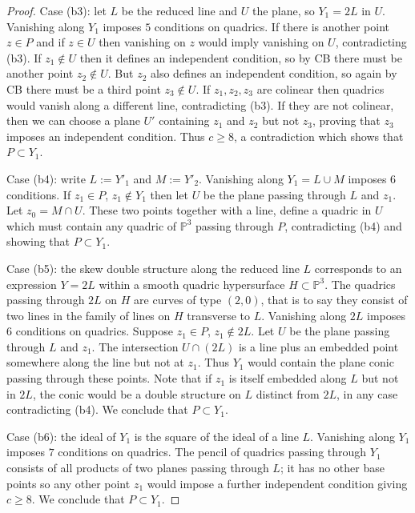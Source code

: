\documentclass{amsart}
\theoremstyle{plain}
\numberwithin{equation}{section}
\begin{document}
\begin{proof}
Case (b3): let $L$ be the reduced line and $U$ the plane, so $Y_1=2L$ in $U$.
Vanishing along $Y_1$ imposes $5$ conditions on quadrics. If there is another point 
$z\in P$ and if $z\in U$ then vanishing on $z$ would imply vanishing on $U$,
contradicting (b3). If $z_1\not \in U$ then it defines an independent condition,
so by CB there must be another point $z_2\not \in U$. But $z_2$ also defines an
independent condition, so again by CB there must be a third point $z_3\not \in U$.
If $z_1,z_2,z_3$ are colinear then quadrics would vanish along a different line,
contradicting (b3). If they are not colinear, then we can choose
a plane $U'$ containing $z_1$ and $z_2$ but not $z_3$, proving that $z_3$ imposes
an independent condition. Thus $c\geq 8$, a contradiction which shows that $P\subset Y_1$.

Case (b4): write $L:= Y'_1$ and $M:= Y'_2$. Vanishing along $Y_1=L\cup M$ imposes 
$6$ conditions. If $z_1\in P$, $z_1\not \in Y_1$ then let $U$ be the plane passing through
$L$ and $z_1$. Let $z_0=M\cap U$. These two points together with a line, define a quadric
in $U$ which must contain any quadric of ${{\mathbb P}} ^3$ passing through $P$, contradicting
(b4) and showing that $P\subset Y_1$. 

Case (b5): the skew double structure along the reduced line $L$ corresponds to
an expression $Y=2L$ within a smooth quadric hypersurface $H\subset {{\mathbb P}} ^3$. The quadrics
passing through $2L$ on $H$ are curves of type $(2,0)$, that is to say they consist
of two lines in the family of lines on $H$ transverse to $L$. Vanishing along $2L$ imposes
$6$ conditions on quadrics. Suppose $z_1\in P$, $z_1\not \in 2L$. 
Let $U$ be the plane passing through
$L$ and 
$z_1$. The intersection $U\cap (2L)$ is a line plus an embedded point somewhere along the line
but not at $z_1$. Thus $Y_1$ would contain the plane conic passing through these points.
Note that if $z_1$ is itself embedded along $L$ but not in $2L$, the conic
would be a double structure on $L$ distinct from $2L$, in any case contradicting (b4).
We conclude that $P\subset Y_1$. 

Case (b6): the ideal of $Y_1$ is the square of the ideal of a line $L$. 
Vanishing along $Y_1$ imposes $7$ conditions on quadrics. The pencil of quadrics
passing through $Y_1$ consists of all products of two planes passing through $L$;
it has no other base points so any other point $z_1$ would impose a further independent
condition giving $c\geq 8$. We conclude that $P\subset Y_1$. 


\end{proof}
\end{document}
